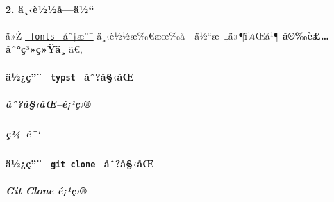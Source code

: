 \paragraph{2. ä¸‹è½½å­---ä½``}\label{uxe4uxe8uxbduxbduxe5uxe4uxbd}

ä»Ž
\href{https://github.com/TJ-CSCCG/tongji-undergrad-thesis-typst/tree/fonts}{\texttt{\ fonts\ }
åˆ†æ''¯} ä¸‹è½½æ‰€æœ‰å­---ä½``æ--‡ä»¶ï¼Œå¹¶
\textbf{å®‰è£\ldots åˆ°ç³»ç»Ÿä¸­} ã€‚

\paragraph{\texorpdfstring{ä½¿ç''¨ \texttt{\ typst\ }
åˆ?å§‹åŒ--}{ä½¿ç''¨  typst  åˆ?å§‹åŒ--}}\label{uxe4uxbduxe7-typst-uxe5ux2c6uxe5uxe5ux153}

\subparagraph{åˆ?å§‹åŒ--é¡¹ç›®}\label{uxe5ux2c6uxe5uxe5ux153uxe9uxb9uxe7}

\begin{Shaded}
\begin{Highlighting}[]
\end{Highlighting}
\end{Shaded}

\subparagraph{ç¼--è¯`}\label{uxe7uxbcuxe8}

\begin{Shaded}
\begin{Highlighting}[]
\end{Highlighting}
\end{Shaded}

\paragraph{\texorpdfstring{ä½¿ç''¨ \texttt{\ git\ clone\ }
åˆ?å§‹åŒ--}{ä½¿ç''¨  git clone  åˆ?å§‹åŒ--}}\label{uxe4uxbduxe7-git-clone-uxe5ux2c6uxe5uxe5ux153}

\subparagraph{Git Clone é¡¹ç›®}\label{git-clone-uxe9uxb9uxe7}

\begin{Shaded}
\begin{Highlighting}[]
\end{Highlighting}
\end{Shaded}


